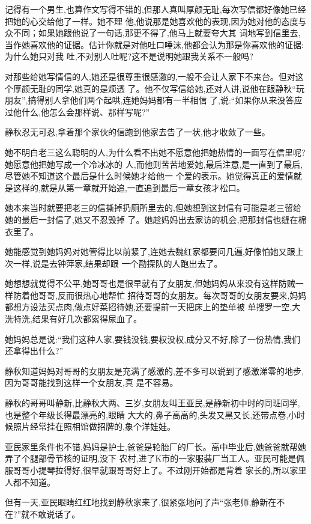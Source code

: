 ﻿\documentclass[12pt]{article}
\begin{document}
记得有一个男生,也算作文写得不错的,但那人真叫厚颜无耻,每次写信都好像她已经把她的心交给他了一样。她不理
他,他说那是她喜欢他的表现,因为她对他的态度与众不同；如果她跟他说了一句话,那更不得了,他马上就要夸大其
词地写到信里去,当作她喜欢他的证据。估计你就是对他吐口唾沫,他都会认为那是你喜欢他的证据:为什么她只对我
吐,不对别人吐呢?这不是说明她跟我关系不一般吗?

对那些给她写情信的人,她还是很尊重很感激的,一般不会让人家下不来台。但对这个厚颜无耻的同学,她真的是烦透
了。他不仅写信给她,还对人讲,说他在跟静秋``玩朋友'',搞得别人拿他们两个起哄,连她妈妈都有一半相信
了,说:``如果你从来没答应过他什么,他怎么会那样说、那样写呢?''

静秋忍无可忍,拿着那个家伙的信跑到他家去告了一状,他才收敛了一些。

她不明白老三这么聪明的人,为什么看不出她不愿意他把她热情的一面写在信里呢?她愿意他把她写成一个冷冰冰的
人,而他则苦苦地爱她,最后\myrule 注意,是一直到了最后,尽管她不知道这个最后是什么时候\myrule 她才给他一
个爱的表示。她觉得真正的爱情就是这样的,就是从第一章就开始追,一直追到最后一章女孩才松口。

她本来当时就要把老三的信撕掉扔厕所里去的,但她想到这封信有可能是老三留给她的最后一封信了,她又不忍毁掉
了。她趁妈妈出去家访的机会,把那封信也缝在棉衣里了。

她能感觉到她妈妈对她管得比以前紧了,连她去魏红家都要问几遍,好像怕她又跟上次一样,说是去钟萍家,结果却跟
一个勘探队的人跑出去了。

她想想就觉得不公平,她哥哥也是很早就有了女朋友,但她妈妈从来没有这样防贼一样防着他哥哥,反而很热心地帮忙
招待哥哥的女朋友。每次哥哥的女朋友要来,妈妈都想方设法买点肉,做点好菜招待她,还要提前一天把床上的垫单被
单搜罗一空,大洗特洗,结果有好几次都累得尿血了。

她妈妈总是说:``我们这种人家,要钱没钱,要权没权,成分又不好,除了一份热情,我们还拿得出什么?''

静秋知道妈妈对哥哥的女朋友是充满了感激的,差不多可以说到了感激涕零的地步,因为哥哥能找到这样一个女朋友,真
是不容易。

静秋的哥哥叫静新,比静秋大两、三岁,女朋友叫王亚民,是静新初中时的同班同学,也是整个年级长得最漂亮的,眼睛
大大的,鼻子高高的,头发又黑又长,还带点卷,小时候照片经常挂在照相馆做招牌的,象个洋娃娃。


亚民家里条件也不错,妈妈是护士,爸爸是轮胎厂的厂长。高中毕业后,她爸爸就帮她弄了个腿部骨节核的证明,没下
农村,进了K市的一家服装厂当工人。亚民可能是佩服哥哥小提琴拉得好,很早就跟哥哥好上了。不过刚开始都是背着
家长的,所以家里人都不知道。

但有一天,亚民眼睛红红地找到静秋家来了,很紧张地问了声``张老师\myrule ,静新在不在?''就不敢说话了。
\end{document}
